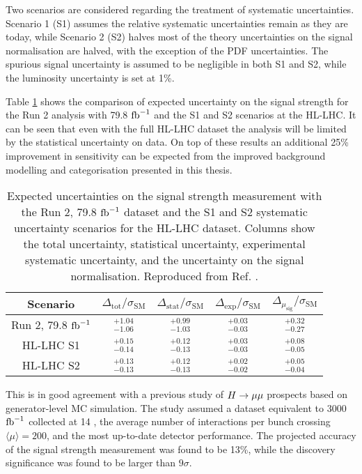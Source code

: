 Two scenarios are considered regarding the treatment of systematic
uncertainties. Scenario 1 (S1) assumes the relative systematic
uncertainties remain as they are today, while Scenario 2 (S2)
halves most of the theory uncertainties on the signal normalisation
are halved, with the exception of the PDF uncertainties. The
spurious signal uncertainty is assumed to be negligible in both S1
and S2, while the luminosity uncertainty is set at 1\%.

Table \ref{tab:out:res} shows the comparison of expected uncertainty
on the signal strength for the Run 2 analysis with 79.8 $\text{fb}^{-1}$
and the S1 and S2 scenarios at the HL-LHC. It can be seen that 
even with the full HL-LHC dataset the analysis will be limited
by the statistical uncertainty on data. On top of these results
an additional 25\% improvement in sensitivity can be expected
from the improved background modelling and categorisation
presented in this thesis.

\begin{table}[htb]
  \renewcommand{\arraystretch}{1.3}
  \centering
  \caption{
    Expected uncertainties on the signal strength measurement with
    the Run 2, 79.8 $\text{fb}^{-1}$ dataset and the S1 and S2 systematic
    uncertainty scenarios for the HL-LHC dataset. Columns show
    the total uncertainty, statistical uncertainty, experimental
    systematic uncertainty, and the uncertainty on the signal
    normalisation.
    Reproduced from Ref. \cite{ATL-PHYS-PUB-2018-054}.}
  \label{tab:out:res}
  \begin{tabular}{ccccc}
    \toprule
    \midrule
    Scenario & $\Delta_\text{tot}/\sigma_\text{SM}$ 
             & $\Delta_\text{stat}/\sigma_\text{SM}$ 
             & $\Delta_\text{exp}/\sigma_\text{SM}$ 
             & $\Delta_{\mu_\text{sig}}/\sigma_\text{SM}$ \\
    \midrule
    Run 2, 79.8 $\text{fb}^{-1}$ & $^{+1.04}_{-1.06}$ & $^{+0.99}_{-1.03}$ & $^{+0.03}_{-0.03}$ & $^{+0.32}_{-0.27}$ \\
    HL-LHC S1          & $^{+0.15}_{-0.14}$ & $^{+0.12}_{-0.13}$ & $^{+0.03}_{-0.03}$ & $^{+0.08}_{-0.05}$ \\
    HL-LHC S2          & $^{+0.13}_{-0.13}$ & $^{+0.12}_{-0.13}$ & $^{+0.02}_{-0.02}$ & $^{+0.05}_{-0.04}$ \\
    \midrule
    \bottomrule
  \end{tabular}
\end{table}

This is in good agreement with a previous study of $H \rightarrow \mu\mu$ prospects
\cite{ATL-PHYS-PUB-2018-006} based on generator-level MC simulation.
The study assumed a dataset equivalent to 3000 $\text{fb}^{-1}$ collected at 14
\TeV, the average number of interactions per bunch crossing
$\langle \mu \rangle = 200$, and the most up-to-date detector performance.
The projected accuracy of the signal strength measurement was found to
be 13\%, while the discovery significance was found to be larger than
$9\sigma$.









